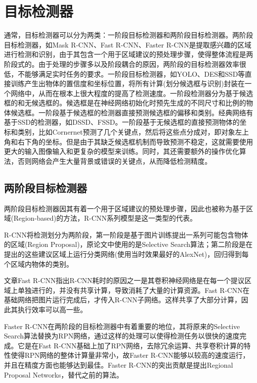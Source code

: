 \section{目标检测器}
通常，目标检测器可以分为两类：一阶段目标检测器和两阶段目标检测器。两阶段目标检测器，如Mask R-CNN\cite{MRCNN}、Fast R-CNN\cite{FRCNN}、Faster R-CNN\cite{Faster}是提取感兴趣的区域进行检测和识别，由于其包含一个用于区域建议的预处理步骤，使得整体流程是两阶段式的。由于处理的步骤多以及阶段耦合的原因，两阶段的目标检测器效率很低，不能够满足实时任务的要求。一阶段目标检测器，如YOLO\cite{YOLO}、DES\cite{DES}和SSD\cite{SSD}等直接训练产生出物体的置信度和坐标位置，将所有计算(划分候选框与识别)封装在一个网络中，从而在根本上很大程度的提高了检测速度。一阶段检测器分为基于候选框的和无候选框的。候选框是在神经网络初始化时预先生成的不同尺寸和比例的物体候选框。一阶段基于候选框的检测器直接预测候选框的偏移和类别。经典网络有基于SSD的检测器，如DSSD\cite{DSSD}、FSSD\cite{FSSD}。一阶段基于无候选框的直接预测物体的坐标和类别，比如Cornernet\cite{CornerNet}预测了几个关键点，然后将这些点分成对，即对象左上角和右下角的坐标。但是由于其缺乏候选框机制而导致预测不稳定，这就需要使用更大的输入图像输入和更复杂的模型来训练。同时，其还需要额外的操作优化算法，否则网络会产生大量背景或错误的关键点，从而降低检测精度。

\subsection{两阶段目标检测器}
两阶段目标检测器因其有着一个用于区域建议的预处理步骤，因此也被称为基于区域(Region-based)的方法，R-CNN系列模型是这一类型的代表。

R-CNN\cite{RCNN}将检测划分为两阶段，第一阶段是基于图片训练提出一系列可能包含物体的区域(Region Proposal)，原论文中使用的是Selective Search算法；第二阶段是在提出的这些建议区域上运行分类网络(使用当时效果最好的AlexNet\cite{AlexNet})，回归得到每个区域内物体的类别。

文章Fast R-CNN\cite{FRCNN}指出R-CNN耗时的原因之一是其卷积神经网络是在每一个提议区域上单独进行的，并没有共享计算，导致消耗了大量的计算资源。Fast R-CNN在基础网络把图片运行完成后，才传入R-CNN子网络。这样共享了大部分计算，因此其执行效率可以高一些。

Faster R-CNN\cite{FRCNN}在两阶段的目标检测器中有着重要的地位，其将原来的Selective Search算法替换为RPN网络，通过这样的处理可以使得检测任务以很快的速度完成。它是在Fast R-CNN基础上加了RPN网络，去除冗余运算、共享卷积计算的特性使得RPN网络的整体计算量非常小，故Faster R-CNN能够以较高的速度运行，并且在精度方面也能够达到最佳。Faster R-CNN的突出贡献是提出Regional Proposal Networks，替代之前的算法。

